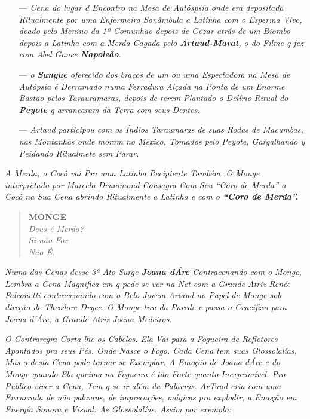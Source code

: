 \begin{itemize}
\item[---] \emph{Cena do lugar d Encontro na Mesa de Autóspsia onde era depositada
Ritualmente por uma Enfermeira Sonâmbula a Latinha com o Esperma Vivo,
doado pelo Menino da 1ª Comunhão depois de Gozar atrás de um Biombo
depois a Latinha com a Merda Cagada pelo \textbf{Artaud-Marat}, o do
Filme q fez com Abel Gance \textbf{Napoleão}.}

\item[---] \emph{o \textbf{Sangue} oferecido dos braços de um ou uma Espectadora
  na Mesa de Autópsia é Derramado numa Ferradura Alçada na Ponta de um
  Enorme Bastão pelos Tarauramaras, depois de terem Plantado o Delírio
  Ritual do \textbf{Peyote} q arrancaram da Terra com seus Dentes.}

\item[---] \emph{Artaud participou com os Índios Taraumaras de suas Rodas de
  Macumbas, nas Montanhas onde moram no México, Tomados pelo Peyote,
  Gargalhando y Peidando Ritualmete sem Parar.}
\end{itemize}

\emph{A Merda, o Cocô vai Pra uma Latinha Recipiente Também. O
Monge interpretado por Marcelo Drummond Consagra Com Seu
``Côro de Merda'' o Cocô na Sua Cena abrindo Ritualmente a
Latinha e com o \textbf{``Coro de Merda''.}}

\begin{verse}
\textbf{MONGE}\\
\emph{Deus é Merda?}\\
\emph{Si não For}\\
\emph{Não É.}
\end{verse}


\bigskip

\noindent\emph{Numa das Cenas desse 3º Ato Surge \textbf{Joana dÁrc}
Contracenando com o Monge, Lembra a Cena Magnifica em q pode se ver na
Net com a Grande Atriz Renée Falconetti contracenando com o Belo Jovem
Artaud no Papel de Monge sob direção de Theodore Dryee. O Monge tira da
Parede e passa o Crucifixo para Joana d'Árc, a Grande Atriz Joana Medeiros.}

\emph{O Contraregra Corta-lhe os Cabelos. Ela Vai para a Fogueira de
Refletores Apontados pra seus Pés. Onde Nasce o Fogo. Cada Cena tem suas
Glossolalías, Mas o desta Cena pode tornar-se Exemplar. A Emoção de
Joana dÁrc e do Monge quando Ela queima na Fogueira é tão Forte quanto
Inexprimível. Pro Publico viver a Cena, Tem q se ir além da Palavras.
ArTaud cria com uma Enxurrada de não palavras, de imprecações, mágicas
pra explodir, a Emoção em Energía Sonora e Visual: As Glossolalías.
Assim por exemplo:}

